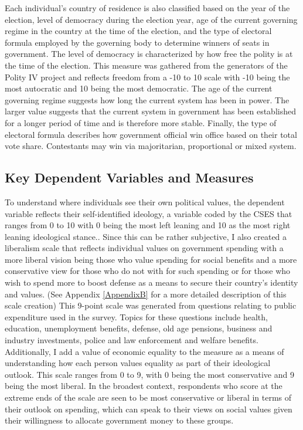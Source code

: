 \documentclass[12pt, titlepage]{article}
\begin{document}
Each individual's country of residence is also classified based on the year of the election, level of democracy during the election year,  age of the current governing regime in the country at the time of the election, and the type of electoral formula employed by the governing body to determine winners of seats in government. The level of democracy is characterized by how free the polity is at the time of the election. This measure was gathered from the generators of the Polity IV project and reflects freedom from a -10 to 10 scale with -10 being the most autocratic and 10 being the most democratic. The age of the current governing regime suggests how long the current system has been in power. The larger value suggests that the current system in government has been established for a longer period of time and is therefore more stable. Finally, the type of electoral formula describes how government official win office based on their total vote share. Contestants may win via majoritarian, proportional or mixed system. 


\subsection{Key Dependent Variables and Measures}

To understand where individuals see their own political values, the dependent variable reflects their self-identified ideology, a variable coded by the CSES that ranges from 0 to 10 with 0 being the most left leaning and 10 as the most right leaning ideological stance.. Since this can be rather subjective, I also created a liberalism scale that reflects individual values on government spending with a more liberal vision being those who value spending for social benefits and a more conservative view for those who do not with for such spending or for those who wish to spend more to boost defense as a means to secure their country's identity and values. (See Appendix \ref{AppendixB} for a more detailed description of this scale creation) This 9-point scale was generated from questions relating to public expenditure used in the survey. Topics for these questions include health, education, unemployment benefits, defense, old age pensions, business and industry investments, police and law enforcement and welfare benefits. Additionally, I add a value of economic equality to the measure as a means of understanding how each person values equality as part of their ideological outlook. This scale ranges from 0 to 9, with 0 being the most conservative and 9 being the most liberal. In the broadest context, respondents who score at the extreme ends of the scale are seen to be most conservative or liberal in terms of their outlook on spending, which can speak to their views on social values given their willingness to allocate government money to these groups.
\end{document}

